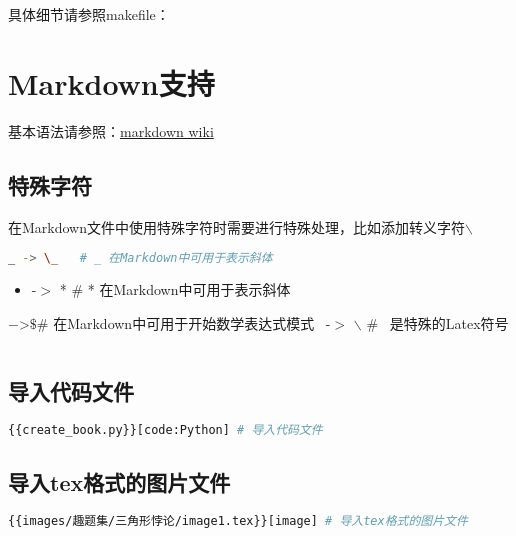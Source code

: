 \documentclass[12pt, letterpaper]{ctexrep}
\begin{document}
具体细节请参照makefile：



\chapter{Markdown支持}

基本语法请参照：\href{https://simplemde.com/markdown-guide}{markdown wiki}

\section{特殊字符}

在Markdown文件中使用特殊字符时需要进行特殊处理，比如添加转义字符$\backslash$
\begin{lstlisting}[language=Bash]
_ -> \_   # _ 在Markdown中可用于表示斜体\end{lstlisting}

\begin{itemize}
\item{ -$>$ *   \# * 在Markdown中可用于表示斜体 }
\end{itemize}

$ -$>$ \$   \# $ 在Markdown中可用于开始数学表达式模式
\ -$>$ $\backslash$   \# \ 是特殊的Latex符号
\begin{lstlisting}[language=Bash]
\end{lstlisting}
\section{导入代码文件}

\begin{lstlisting}[language=Bash]
{{create_book.py}}[code:Python] # 导入代码文件
\end{lstlisting}



\section{导入tex格式的图片文件}

\begin{lstlisting}[language=Bash]
{{images/趣题集/三角形悖论/image1.tex}}[image] # 导入tex格式的图片文件
\end{lstlisting}

\begin{center}

\end{center}
\end{document}
